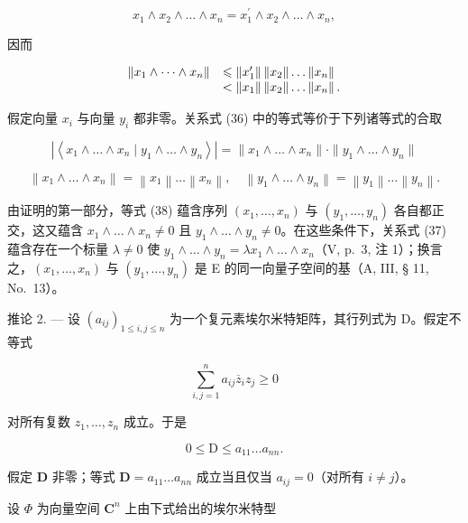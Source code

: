 \[
x _ {1} \wedge x _ {2} \wedge \ldots \wedge x _ {n} = x _ {1} ^ {\prime} \wedge x _ {2} \wedge \ldots \wedge x _ {n},
\]

因而

\[
\begin{array}{r l} \left\| x _ {1} \wedge \dots \wedge x _ {n} \right\| & \leqslant \left\| x _ {1} ^ {\prime} \right\| \left\| x _ {2} \right\| \dots \left\| x _ {n} \right\| \\ & <   \left\| x _ {1} \right\| \left\| x _ {2} \right\| \dots \left\| x _ {n} \right\|. \end{array}
\]

假定向量 \(x_{i}\) 与向量 \(y_{i}\) 都非零。关系式 (36) 中的等式等价于下列诸等式的合取

\[
\left| \left\langle x _ {1} \wedge \dots \wedge x _ {n} \mid y _ {1} \wedge \dots \wedge y _ {n} \right\rangle \right| = \| x _ {1} \wedge \dots \wedge x _ {n} \| \cdot \| y _ {1} \wedge \dots \wedge y _ {n} \|\tag{37}
\]

\[
\left\| x _ {1} \wedge \dots \wedge x _ {n} \right\| = \left\| x _ {1} \right\| \dots \left\| x _ {n} \right\|, \quad \left\| y _ {1} \wedge \dots \wedge y _ {n} \right\| = \left\| y _ {1} \right\| \dots \left\| y _ {n} \right\|.\tag{38}
\]

由证明的第一部分，等式 (38) 蕴含序列 \((x_{1},\ldots ,x_{n})\) 与 \((y_{1},\ldots ,y_{n})\) 各自都正交，这又蕴含 \(x_{1}\wedge \ldots \wedge x_{n}\neq 0\) 且 \(y_{1}\wedge \ldots \wedge y_{n}\neq 0\)。在这些条件下，关系式 (37) 蕴含存在一个标量 \(\lambda \neq 0\) 使 \(y_{1}\wedge \ldots \wedge y_{n} = \lambda x_{1}\wedge \ldots \wedge x_{n}\)（V, p.~3, 注 1）；换言之，\((x_{1},\dots,x_{n})\) 与 \((y_{1},\dots,y_{n})\) 是 E 的同一向量子空间的基（A, III, § 11, No.~13）。

推论 2. --- 设 \((a_{ij})_{1\leqslant i,j\leqslant n}\) 为一个复元素埃尔米特矩阵，其行列式为 D。假定不等式

\[
\sum_ {i, j = 1} ^ {n} a _ {i j} \overline {{z}} _ {i} z _ {j} \geqslant 0\tag{39}
\]

对所有复数 \(z_{1}, \ldots, z_{n}\) 成立。于是

\[
0 \leqslant \mathrm{D} \leqslant a _ {1 1} \dots a _ {n n}.\tag{40}
\]

假定 \(\mathbf{D}\) 非零；等式 \(\mathbf{D} = a_{11} \ldots a_{nn}\) 成立当且仅当 \(a_{ij} = 0\)（对所有 \(i \neq j\)）。

设 \(\Phi\) 为向量空间 \(\mathbf{C}^n\) 上由下式给出的埃尔米特型

